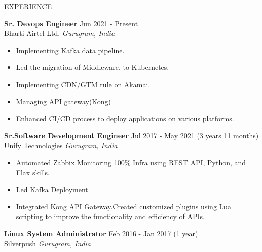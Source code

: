 \documentclass{resume} %
\begin{document}



\begin{rSection}{EXPERIENCE}

\textbf{Sr. Devops Engineer } \hfill Jun 2021 - Present \\
Bharti Airtel Ltd. \hfill \textit{Gurugram, India}
 \begin{itemize}
    \itemsep -3pt {} 
     \item Implementing Kafka data pipeline.
     \item Led the migration of Middleware, to Kubernetes.
     \item Implementing CDN/GTM rule on Akamai.
     \item Managing API gateway(Kong)
    \item Enhanced CI/CD process to deploy applications on various platforms.
 \end{itemize}
 
\textbf{Sr.Software Development Engineer} \hfill Jul 2017 - May 2021 (3 years 11 months)\\
Unify Technologies \hfill \textit{Gurugram, India}
 \begin{itemize}
    \itemsep -3pt {} 
     \item Automated Zabbix Monitoring 100\% Infra using REST API, Python, and Flax skills.
     \item Led Kafka Deployment
    \item Integrated Kong API Gateway.Created customized plugins using Lua scripting to improve the functionality and efficiency of APIs. 
 \end{itemize}

\textbf{Linux System Administrator} \hfill Feb 2016 - Jan 2017 (1 year)\\
Silverpush \hfill \textit{Gurugram, India}


\end{rSection}
\end{document}
